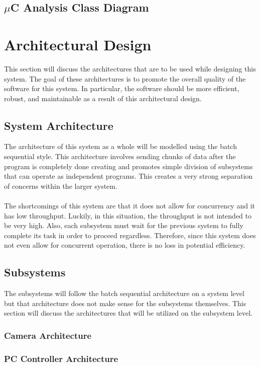 \documentclass[titlepage]{article}
\begin{document}
\subsection{$\mu$C Analysis Class Diagram}


\section{Architectural Design}
This section will discuss the architectures that are to be used while designing this system. The goal of these architectures is to promote the overall quality of the software for this system. In particular, the software should be more efficient, robust, and maintainable as a result of this architectural design.
\subsection{System Architecture}
The architecture of this system as a whole will be modelled using the batch sequential style. This architecture involves sending chunks of data after the program is completely done creating and promotes simple division of subsystems that can operate as independent programs. This creates a very strong separation of concerns within the larger system.\\~\\
The shortcomings of this system are that it does not allow for concurrency and it has low throughput. Luckily, in this situation, the throughput is not intended to be very high. Also, each subsystem must wait for the previous system to fully complete its task in order to proceed regardless. Therefore, since this system does not even allow for concurrent operation, there is no loss in potential efficiency.
\subsection{Subsystems}
The subsystems will follow the batch sequential architecture on a system level but that architecture does not make sense for the subsystems themselves. This section will discuss the architectures that will be utilized on the subsystem level.
\subsubsection{Camera Architecture}
\subsubsection{PC Controller Architecture}
\end{document}
